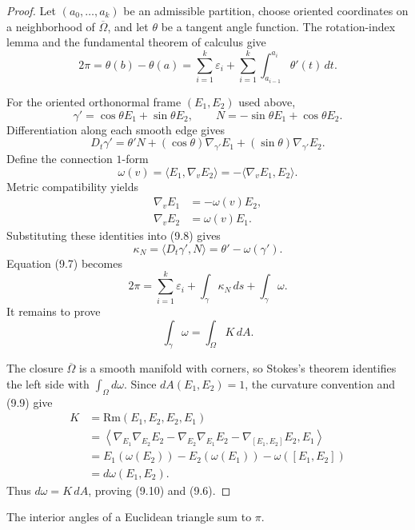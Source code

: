 \begin{proof}
\sketch
Let $(a_0,\ldots,a_k)$ be an admissible partition, choose oriented
coordinates on a neighborhood of $\overline\Omega$, and let $\theta$ be a
tangent angle function.  The rotation-index lemma and the fundamental theorem
of calculus give
\begin{equation}
2\pi=\theta(b)-\theta(a)
=\sum_{i=1}^k\varepsilon_i
+\sum_{i=1}^k\int_{a_{i-1}}^{a_i}\theta'(t)\,dt. \tag{9.7}
\end{equation}

For the oriented orthonormal frame $(E_1,E_2)$ used above,
\[
\gamma'=\cos\theta E_1+\sin\theta E_2,
\qquad
N=-\sin\theta E_1+\cos\theta E_2.
\]
Differentiation along each smooth edge gives
\begin{equation}
D_t\gamma'=\theta'N+(\cos\theta)\nabla_{\gamma'}E_1
+(\sin\theta)\nabla_{\gamma'}E_2. \tag{9.8}
\end{equation}
Define the connection $1$-form
\[
\omega(v)=\langle E_1,\nabla_vE_2\rangle
=-\langle\nabla_vE_1,E_2\rangle.
\]
Metric compatibility yields
\begin{align}
\nabla_vE_1&=-\omega(v)E_2,\\
\nabla_vE_2&=\omega(v)E_1.
\label{eq:covariant-frame-derivatives}
\tag{9.9}
\end{align}
Substituting these identities into (9.8) gives
\[
\kappa_N=\langle D_t\gamma',N\rangle
=\theta'-\omega(\gamma').
\]
Equation (9.7) becomes
\[
2\pi=\sum_{i=1}^k\varepsilon_i
+\int_\gamma\kappa_N\,ds+\int_\gamma\omega.
\]
It remains to prove
\begin{equation}
\int_\gamma\omega=\int_\Omega K\,dA. \tag{9.10}
\end{equation}

The closure $\overline\Omega$ is a smooth manifold with corners, so Stokes's
theorem identifies the left side with $\int_\Omega d\omega$.  Since
$dA(E_1,E_2)=1$, the curvature convention and (9.9) give
\begin{align*}
K
&=\mathrm{Rm}(E_1,E_2,E_2,E_1)\\
&=\left\langle
\nabla_{E_1}\nabla_{E_2}E_2
-\nabla_{E_2}\nabla_{E_1}E_2
-\nabla_{[E_1,E_2]}E_2,E_1\right\rangle\\
&=E_1(\omega(E_2))-E_2(\omega(E_1))-\omega([E_1,E_2])\\
&=d\omega(E_1,E_2).
\end{align*}
Thus $d\omega=K\,dA$, proving (9.10) and (9.6).
\end{proof}

\begin{corollary}
\label{cor:angle-sum-theorem}

The interior angles of a Euclidean triangle sum to $\pi$.
\end{corollary}

